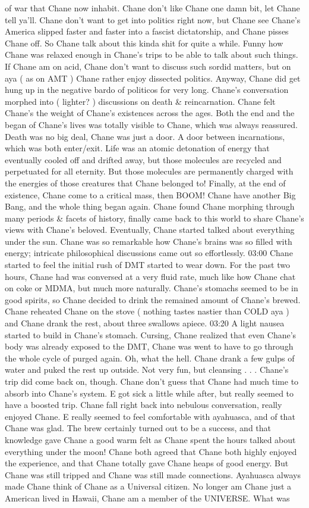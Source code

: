 \documentclass[12pt]{book}
\begin{document}
of war that Chane now inhabit. Chane don't like Chane one damn bit, let Chane tell ya'll. Chane don't want to get into politics right now, but Chane see Chane's America slipped faster and faster into a fascist dictatorship, and Chane pisses Chane off. So Chane talk about this kinda shit for quite a while. Funny how Chane was relaxed enough in Chane's trips to be able to talk about such things. If Chane am on acid, Chane don't want to discuss such sordid matters, but on aya ( as on AMT ) Chane rather enjoy dissected politics. Anyway, Chane did get hung up in the negative bardo of politicos for very long. Chane's conversation morphed into ( lighter? ) discussions on death \& reincarnation. Chane felt Chane's the weight of Chane's existences across the ages. Both the end and the began of Chane's lives was totally visible to Chane, which was always reassured. Death was no big deal, Chane was just a door. A door between incarnations, which was both enter/exit. Life was an atomic detonation of energy that eventually cooled off and drifted away, but those molecules are recycled and perpetuated for all eternity. But those molecules are permanently charged with the energies of those creatures that Chane belonged to! Finally, at the end of existence, Chane come to a critical mass, then BOOM! Chane have another Big Bang, and the whole thing began again. Chane found Chane morphing through many periods \& facets of history, finally came back to this world to share Chane's views with Chane's beloved. Eventually, Chane started talked about everything under the sun. Chane was so remarkable how Chane's brains was so filled with energy; intricate philosophical discussions came out so effortlessly. 03:00 Chane started to feel the initial rush of DMT started to wear down. For the past two hours, Chane had was conversed at a very fluid rate, much like how Chane chat on coke or MDMA, but much more naturally. Chane's stomachs seemed to be in good spirits, so Chane decided to drink the remained amount of Chane's brewed. Chane reheated Chane on the stove ( nothing tastes nastier than COLD aya ) and Chane drank the rest, about three swallows apiece. 03:20 A light nausea started to build in Chane's stomach. Cursing, Chane realized that even Chane's body was already exposed to the DMT, Chane was went to have to go through the whole cycle of purged again. Oh, what the hell. Chane drank a few gulps of water and puked the rest up outside. Not very fun, but cleansing . . .  Chane's trip did come back on, though. Chane don't guess that Chane had much time to absorb into Chane's system. E got sick a little while after, but really seemed to have a boosted trip. Chane fall right back into nebulous conversation, really enjoyed Chane. E really seemed to feel comfortable with ayahuasca, and of that Chane was glad. The brew certainly turned out to be a success, and that knowledge gave Chane a good warm felt as Chane spent the hours talked about everything under the moon! Chane both agreed that Chane both highly enjoyed the experience, and that Chane totally gave Chane heaps of good energy. But Chane was still tripped and Chane was still made connections. Ayahuasca always made Chane think of Chane as a Universal citizen. No longer am Chane just a American lived in Hawaii, Chane am a member of the UNIVERSE. What was 
\end{document}
